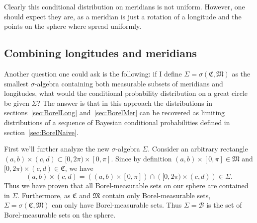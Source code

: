 \documentclass[twoside,a4paper]{report}
\theoremstyle{plain}
\theoremstyle{definition}
\theoremstyle{remark}
\numberwithin{equation}{chapter}
\DeclareMathOperator{\1}{\mathbbm{1}}
\newcommand{\B}{\mathcal{B}}
\begin{document}
Clearly this conditional distribution on meridians is not uniform. However, one should expect they are, as a meridian is just a rotation of a longitude and the points on the sphere where spread uniformly.

\subsection{Combining longitudes and meridians}
Another question one could ask is the following: if I define $\Sigma=\sigma(\mathfrak{C},\mathfrak{M})$ as the smallest $\sigma$-algebra containing both measurable subsets of meridians and longitudes, what would the conditional probability distribution on a great circle be given $\Sigma$? The answer is that in this approach the distributions in sections~\ref{sec:BorelLong} and~\ref{sec:BorelMer} can be recovered as limiting distributions of a sequence of Bayesian conditional probabilities defined in section~\ref{sec:BorelNaive}.

First we'll further analyze the new $\sigma$-algebra $\Sigma$. Consider an arbitrary rectangle $(a,b)\times(c,d)\subset[0,2\pi)\times[0,\pi]$. Since by definition $(a,b)\times[0,\pi]\in\mathfrak{M}$ and $[0,2\pi)\times(c,d)\in\mathfrak{C}$, we have
\[(a,b)\times(c,d)=\left((a,b)\times[0,\pi]\right)\cap\left([0,2\pi)\times(c,d)\right)\in\Sigma.\]
Thus we have proven that all Borel-measurable sets on our sphere are contained in $\Sigma$. Furthermore, as $\mathfrak{C}$ and $\mathfrak{M}$ contain only Borel-measurable sets, $\Sigma=\sigma(\mathfrak{C},\mathfrak{M})$ can only have Borel-measurable sets. Thus $\Sigma=\B$ is the set of Borel-measurable sets on the sphere.
\end{document}
